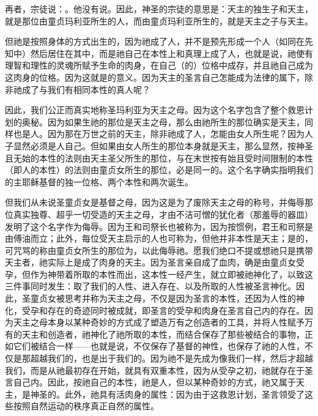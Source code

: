 再者，宗徒说：。他没有说。因此，神圣的宗徒的意思是：天主的独生子和天主，就是那位由童贞玛利亚所生的人，而由童贞玛利亚所生的，就是天主之子与天主。\par

但祂是按照身体的方式出生的，因为祂成了人，并不是预先形成一个人（如同在先知中）然后居住在其中，而是祂自己在本性上和真理上成了人，也就是说，祂使有理智和理性的灵魂所赋予生命的肉身，在自己（的）位格中成存，并且祂自己成为这肉身的位格。因为这就是的意义。因为天主的圣言自己怎能成为法律的属下，除非祂成了与我们有相同本性的真人呢？\par

因此，我们公正而真实地称圣玛利亚为天主之母。因为这个名字包含了整个救恩计划的奥秘。因为如果生祂的那位是天主之母，那么由祂所生的那位确实是天主，同样也是人。因为那在万世之前的天主，除非祂成了人，怎能由女人所生呢？因为人子显然必须是人自己。但如果由女人所生的那位本身就是天主，那么显然，按神圣且无始的本性的法则由天主圣父所生的那位，与在末世按有始且受时间限制的本性（即人的本性）的法则由童贞女所生的那位，必是同一的。这个名字确实指明我们的主耶稣基督的独一位格、两个本性和两次诞生。\par

但我们从未说圣童贞女是基督之母，因为这是为了废除天主之母的称号，并侮辱那位真实独尊、超乎一切受造的天主之母，才由不洁可憎的犹化者（那羞辱的器皿）发明了这个名字作为侮辱。因为王和司祭长也被称为，因为按惯例，君王和司祭是由傅油而立；此外，每位受天主启示的人也可称为，但他并非本性是天主；是的，可咒骂的称由童贞女所生的那位为，以此侮辱祂。愿我们绝口不提或想祂只是携带天主者，祂实际上是成了肉身的天主。因为圣言亲自成了血肉，确是由童贞女受孕，但作为神带着所取的本性而出，这本性一经产生，就立即被祂神化了，以致这三件事同时发生：取了我们的人性、进入存在、以及所取的人性被圣言神化。因此，圣童贞女被思考并称为天主之母，不仅是因为圣言的本性，还因为人性的神化，受孕和存在的奇迹同时被成就，即圣言的受孕和肉身在圣言自己内的存在。因为天主之母本身以某种奇妙的方式成了塑造万有之创造者的工具，并将人性赋予万有的天主和创造者，祂神化了祂所取的本性，而结合保存了那些被结合的事物，正如它们被结合一样——也就是说，不仅保存了基督的神性，也保存了祂的人性，不仅是那超越我们的，也是出于我们的。因为祂不是先成为像我们一样，然后才超越我们，而是从祂最初存在开始，就具有双重本性，因为从受孕之初，祂就存在于圣言自己内。因此，按祂自己的本性，祂是人，但以某种奇妙的方式，祂又属于天主，是神圣的。此外，祂具有活肉身的属性：因为由于这救恩计划，圣言领受了这些按照自然运动的秩序真正自然的属性。\par

